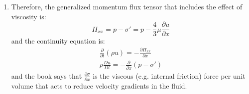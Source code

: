 ﻿\documentclass[11pt]{article}
\begin{document}
\begin{enumerate}
  where $\frac{4}{3}$ is a numerical factor that comes from a more accurate kinetic theory calculation for an ideal gas, and $\mu \propto n m \nu l = \rho \nu l$ is the dynamic viscosity coefficient of the gas.
  \textcolor{blue}{The chatGPT says that viscosity is rate of momentum diffusion that arises from the velocity gradients in the fluid, which physically means that particles from faster layers transfer momentum to slower layers through collisions, which is exactly what we analyzed here. In contrast, thermodynamic pressure arises from the random isotropic motion of particle that exists even in the a unifrom flow without velocity gradients (e.g. equillibrium).}
  \item Therefore, the generalized momentum flux tensor that includes the effect of viscosity is:
  \begin{equation}
    \Pi_{xx} = p - \sigma' = p - \frac{4}{3} \mu \frac{\partial u}{\partial x}
  \end{equation}
  and the continuity equation is:
  \begin{align}
    \frac{\partial}{\partial t}(\rho u) = -\frac{\partial \Pi_{xx}}{\partial x} \\
    \rho \frac{Du}{Dt} = -\frac{\partial}{\partial x}(p - \sigma')
  \end{align}
  and the book says that $\frac{\partial \sigma}{\partial x}$ is the viscous (e.g. internal friction) force per unit volume that acts to reduce velocity gradients in the fluid.
  \end{enumerate}
\end{document}
